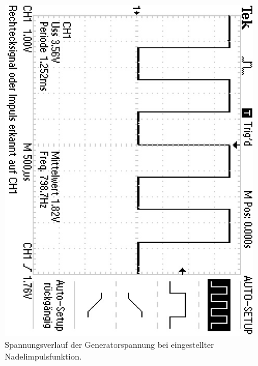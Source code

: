 \begin{figure}
	\centering
	\caption{Spannungsverlauf der Generatorspannung bei eingestellter Nadelimpulsfunktion.}
	\label{fig:blabliblub}
	\includegraphics[width = 0.6 \textwidth, angle=90]{Bilder/a)rectangle/F0001TEK.JPG}
\end{figure}
